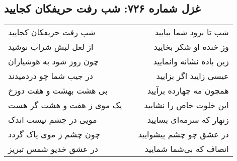 \begin{center}
\section*{غزل شماره ۷۲۶: شب رفت حریفکان کجایید}
\label{sec:0726}
\begin{longtable}{l p{0.5cm} r}
شب رفت حریفکان کجایید
&&
شب تا برود شما بیایید
\\
از لعل لبش شراب نوشید
&&
وز خنده او شکر بخایید
\\
چون روز شود به هوشیاران
&&
زین باده نشانه وانمایید
\\
در جیب شما چو دردمیدند
&&
عیسی زایید اگر بزایید
\\
بی هشت بهشت و هفت دوزخ
&&
همچون مه چهارده برآیید
\\
یک موی ز هفت و هشت گر هست
&&
این خلوت خاص را نشایید
\\
مویی در چشم نیست اندک
&&
زنهار که سرمه‌ای بسایید
\\
چون چشم ز موی پاک گردد
&&
در عشق چو چشم پیشوایید
\\
در عشق خدیو شمس تبریز
&&
انصاف که بی‌شما شمایید
\\
\end{longtable}
\end{center}
